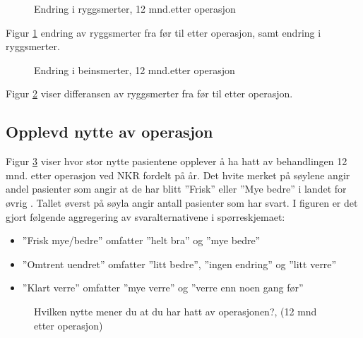 \documentclass [norsk,a4paper,twoside]{article}\usepackage[]{graphicx}\usepackage[]{color}
\begin{document}
\begin{figure}[h] 
\centerline{
  }
  \caption{Endring i ryggsmerter, 12 mnd.etter operasjon}
  \label{fig:SmRygg}
\end{figure}

Figur \ref{fig:SmRygg} endring av ryggsmerter fra før til etter operasjon, samt endring i ryggsmerter.




\begin{figure}[h] 
\centerline{
  }
  \caption{Endring i beinsmerter, 12 mnd.etter operasjon}
  \label{fig:SmBein}
\end{figure}

Figur \ref{fig:SmBein} viser differansen av ryggsmerter fra før til etter operasjon.


\clearpage


\subsection{Opplevd nytte av operasjon}

Figur \ref{fig:Nytte} viser hvor stor nytte pasientene opplever å ha hatt av behandlingen 12 mnd. etter operasjon ved NKR fordelt på år. Det hvite merket på søylene angir andel pasienter som angir at de har blitt ''Frisk'' eller ''Mye bedre'' i landet for øvrig . Tallet øverst på søyla angir antall pasienter som har svart. 
I figuren er det gjort følgende aggregering av svaralternativene i spørreskjemaet:
\begin{itemize}
	\item ''Frisk mye/bedre'' omfatter ''helt bra'' og ''mye bedre'' 
	\item ''Omtrent uendret'' omfatter ''litt bedre'', ''ingen endring'' og ''litt verre'' 
	\item ''Klart verre'' omfatter ''mye verre'' og ''verre enn noen gang før''
\end{itemize}



\begin{figure}[h] 
	\begin{center}
	\end{center}
  \caption{Hvilken nytte mener du at du har hatt av operasjonen?, (12 mnd etter operasjon)}
  \label{fig:Nytte}
\end{figure}
\end{document}
